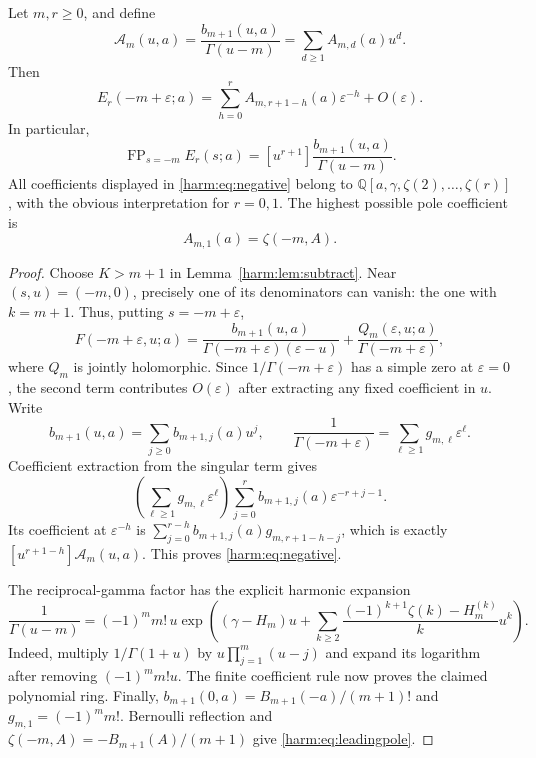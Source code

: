 \begin{theorem}
\label{harm:thm:negative}
Let $m,r\geq0$, and define
\begin{equation}\label{harm:eq:A}
 \mathcal A_m(u,a)=\frac{b_{m+1}(u,a)}{\Gamma(u-m)}
                =\sum_{d\geq1}A_{m,d}(a)u^d.
\end{equation}
Then
\begin{equation}\label{harm:eq:negative}
 \boxed{\quad
 E_r(-m+\varepsilon;a)
  =\sum_{h=0}^{r}A_{m,r+1-h}(a)\varepsilon^{-h}
        +O(\varepsilon).
 \quad}
\end{equation}
In particular,
\begin{equation}\label{harm:eq:FPnegative}
 \operatorname{FP}_{s=-m}E_r(s;a)
       =[u^{r+1}]\frac{b_{m+1}(u,a)}{\Gamma(u-m)}.
\end{equation}
All coefficients displayed in \eqref{harm:eq:negative} belong to
$\mathbb Q[a,\gamma,\zeta(2),\ldots,\zeta(r)]$, with the obvious
interpretation for $r=0,1$.  The highest possible pole coefficient is
\begin{equation}\label{harm:eq:leadingpole}
 A_{m,1}(a)=\zeta(-m,A).
\end{equation}
\end{theorem}
\begin{proof}
Choose $K>m+1$ in Lemma~\ref{harm:lem:subtract}.  Near
$(s,u)=(-m,0)$, precisely one of its denominators can vanish:
the one with $k=m+1$.  Thus, putting $s=-m+\varepsilon$,
\[
 F(-m+\varepsilon,u;a)
  =\frac{b_{m+1}(u,a)}{\Gamma(-m+\varepsilon)(\varepsilon-u)}
       +\frac{Q_m(\varepsilon,u;a)}{\Gamma(-m+\varepsilon)},
\]
where $Q_m$ is jointly holomorphic.  Since $1/\Gamma(-m+\varepsilon)$
has a simple zero at $\varepsilon=0$, the second term contributes
$O(\varepsilon)$ after extracting any fixed coefficient in $u$.
Write
\[
 b_{m+1}(u,a)=\sum_{j\geq0}b_{m+1,j}(a)u^j,
 \qquad \frac1{\Gamma(-m+\varepsilon)}
              =\sum_{\ell\geq1}g_{m,\ell}\varepsilon^\ell.
\]
Coefficient extraction from the singular term gives
\[
 \left(\sum_{\ell\geq1}g_{m,\ell}\varepsilon^\ell\right)
       \sum_{j=0}^r b_{m+1,j}(a)\varepsilon^{-r+j-1}.
\]
Its coefficient at $\varepsilon^{-h}$ is
$\sum_{j=0}^{r-h}b_{m+1,j}(a)g_{m,r+1-h-j}$, which is exactly
$[u^{r+1-h}]\mathcal A_m(u,a)$.  This proves
\eqref{harm:eq:negative}.

The reciprocal-gamma factor has the explicit harmonic expansion
\begin{equation}\label{harm:eq:recipgamma}
 \frac1{\Gamma(u-m)}=(-1)^m m!\,u
 \exp\left((\gamma-H_m)u+
   \sum_{k\geq2}\frac{(-1)^{k+1}\zeta(k)-H_m^{(k)}}k u^k\right).
\end{equation}
Indeed, multiply $1/\Gamma(1+u)$ by
$u\prod_{j=1}^m(u-j)$ and expand its logarithm after removing
$(-1)^m m!u$.  The finite coefficient rule now proves the claimed
polynomial ring.  Finally,
$b_{m+1}(0,a)=B_{m+1}(-a)/(m+1)!$ and
$g_{m,1}=(-1)^m m!$.  Bernoulli reflection and
$\zeta(-m,A)=-B_{m+1}(A)/(m+1)$ give
\eqref{harm:eq:leadingpole}.
\end{proof}

